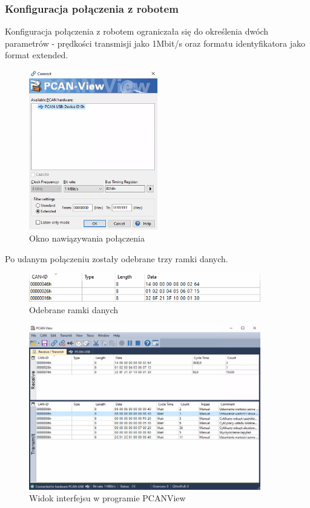 \documentclass[margin = 2cm]{article}
\begin{document}
	\subsubsection{Konfiguracja połączenia z robotem}
	Konfiguracja połączenia z robotem ograniczała się do określenia dwóch parametrów - prędkości transmisji jako 1Mbit/s oraz formatu identyfikatora jako format extended.
	\begin{figure}[H]
		\centering
		\includegraphics[width=0.5\textwidth]{0}
		\caption{Okno nawiązywania połączenia}
	\end{figure}
	Po udanym połączeniu zostały odebrane trzy ramki danych.
	\begin{figure}[H]
		\centering
		\includegraphics[width=0.9\textwidth]{0_1}
		\caption{Odebrane ramki danych}
	\end{figure}
	\begin{figure}[H]
		\centering
		\includegraphics[width=0.9\textwidth]{interfejs}
		\caption{Widok interfejsu w programie PCANView}
	\end{figure}
\end{document}
